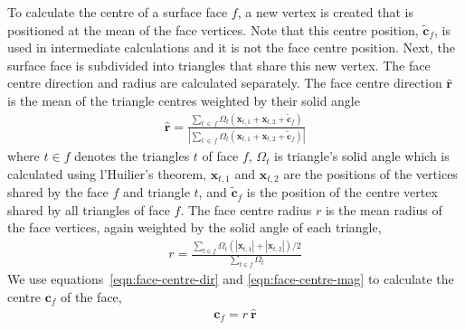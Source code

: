 To calculate the centre of a surface face $f$, a new vertex is created that is positioned at the mean of the face vertices.  Note that this centre position, $\mathbf{\tilde{c}}_f$, is used in intermediate calculations and it is not the face centre position.
Next, the surface face is subdivided into triangles that share this new vertex.
The face centre direction and radius are calculated separately.  The face centre direction $\mathbf{\hat{r}}$ is the mean of the triangle centres weighted by their solid angle
\begin{align}
	\mathbf{\hat{r}} = \frac
	{\sum_{t\:\in\:f}{\Omega_t \left(\mathbf{x}_{t,1} + \mathbf{x}_{t,2} + \mathbf{\tilde{c}}_f \right)}}
	{\left\lvert \sum_{t\:\in\:f}{\Omega_t \left(\mathbf{x}_{t,1} + \mathbf{x}_{t,2} + \mathbf{\tilde{c}}_f \right)} \right\rvert} \label{eqn:face-centre-dir}
\end{align}
where $t\in f$ denotes the triangles $t$ of face $f$, $\Omega_t$ is triangle's solid angle which is calculated using l'Huilier's theorem, $\mathbf{x}_{t,1}$ and $\mathbf{x}_{t,2}$ are the positions of the vertices shared by the face $f$ and triangle $t$, and $\mathbf{\tilde{c}}_f$ is the position of the centre vertex shared by all triangles of face $f$.
The face centre radius $r$ is the mean radius of the face vertices, again weighted by the solid angle of each triangle,
\begin{align}
	r = \frac
	{\sum_{t\in f}{\Omega_t \left(\left\lvert \mathbf{x}_{t,1} \right\rvert + \left\lvert \mathbf{x}_{t,2} \right\rvert \right)/2}}
	{\sum_{t\in f}{\Omega_t}} \label{eqn:face-centre-mag}
\end{align}
We use equations~\eqref{eqn:face-centre-dir} and \eqref{eqn:face-centre-mag} to calculate the centre $\mathbf{c}_f$ of the face,
\begin{align}
	\mathbf{c}_f = r\:\mathbf{\hat{r}}
\end{align}


